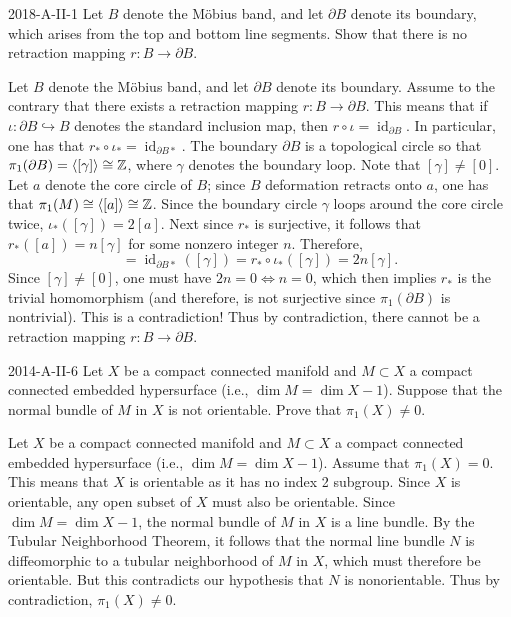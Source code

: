 \documentclass{article}
\begin{document}
	\begin{prb}{2018-A-II-1}
		Let $B$ denote the M\"obius band, and let $\partial B$ denote its boundary, which arises from the top and bottom line segments. Show that there is no retraction mapping $r: B \to \partial B$. 
	\end{prb}
	Let $B$ denote the M\"obius band, and let $\partial B$ denote its boundary. Assume to the contrary that there exists a retraction mapping $r: B \to \partial B$. This means that if $\iota: \partial B \hookrightarrow B$ denotes the standard inclusion map, then $r \circ \iota = \operatorname{id}_{\partial B}$. In particular, one has that $r_{\ast} \circ \iota_{\ast} = \operatorname{id}_{\partial B\ast}$. The boundary $\partial B$ is a topological circle so that $\pi_{1}(\partial B) = \braket{[\gamma]} \cong \mathbb{Z}$, where $\gamma$ denotes the boundary loop. Note that $[\gamma] \neq [0]$. Let $a$ denote the core circle of $B$; since $B$ deformation retracts onto $a$, one has that $\pi_{1}(M) \cong \braket{[a]} \cong \mathbb{Z}$. Since the boundary circle $\gamma$ loops around the core circle twice, $\iota_{\ast}([\gamma]) = 2[a]$. Next since $r_{\ast}$ is surjective, it follows that $r_{\ast}([a]) = n[\gamma]$ for some nonzero integer $n$. Therefore, 
	\begin{equation*}
		[\gamma] = \operatorname{id}_{\partial B\ast}([\gamma]) = r_{\ast} \circ \iota_{\ast}([\gamma]) = 2n[\gamma]. 
	\end{equation*}
	Since $[\gamma] \neq [0]$, one must have $2n = 0 \iff n = 0$, which then implies $r_{\ast}$ is the trivial homomorphism (and therefore, is not surjective since $\pi_{1}(\partial B)$ is nontrivial). This is a contradiction! Thus by contradiction, there cannot be a retraction mapping $r: B \to \partial B$. 
	
	\begin{prb}{2014-A-II-6}
		Let $X$ be a compact connected manifold and $M \subset X$ a compact connected embedded hypersurface (i.e., $\dim{M}= \dim{X} - 1$). Suppose that the normal bundle of $M$ in $X$ is not orientable. Prove that $\pi_{1}(X) \neq 0$. 
	\end{prb}
	Let $X$ be a compact connected manifold and $M \subset X$ a compact connected embedded hypersurface (i.e., $\dim{M} = \dim{X} - 1$). Assume that $\pi_{1}(X) =0$. This means that $X$ is orientable as it has no index 2 subgroup. Since $X$ is orientable, any open subset of $X$ must also be orientable. Since $\dim{M} = \dim{X} - 1$, the normal bundle of $M$ in $X$ is a line bundle. By the Tubular Neighborhood Theorem, it follows that the normal line bundle $N$ is diffeomorphic to a tubular neighborhood of $M$ in $X$, which must therefore be orientable. But this contradicts our hypothesis that $N$ is nonorientable. Thus by contradiction, $\pi_{1}(X) \neq 0$. 
	
\end{document}
